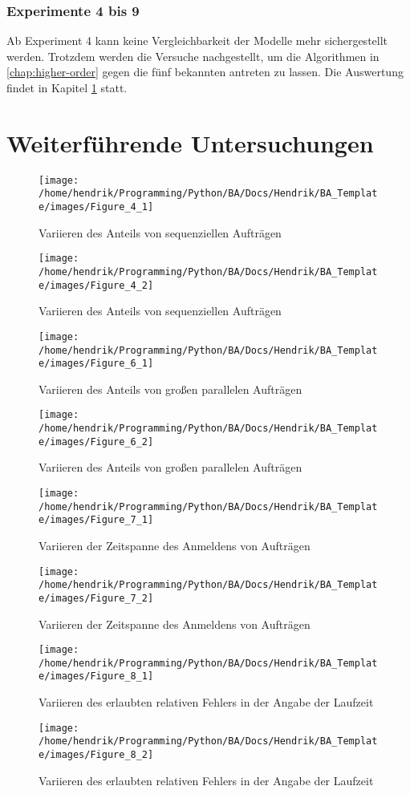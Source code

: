 \FloatBarrier

\subsubsection{Experimente 4 bis 9}
Ab Experiment 4 kann keine Vergleichbarkeit der Modelle mehr sichergestellt werden. Trotzdem werden die Versuche nachgestellt, um die Algorithmen in \ref{chap:higher-order} gegen die fünf bekannten antreten zu lassen. Die Auswertung findet in Kapitel \ref{weiter} statt.


\section{Weiterführende Untersuchungen}
\label{weiter}

\begin{figure}	
	\texttt{[image: /home/hendrik/Programming/Python/BA/Docs/Hendrik/BA\_Template/images/Figure\_4\_1]}
	\caption{Variieren des Anteils von sequenziellen Aufträgen}
	\label{figure_4_1}
\end{figure}
\begin{figure}	
	\texttt{[image: /home/hendrik/Programming/Python/BA/Docs/Hendrik/BA\_Template/images/Figure\_4\_2]}
	\caption{Variieren des Anteils von sequenziellen Aufträgen}
	\label{figure_4_2}
\end{figure}
\begin{figure}	
	\texttt{[image: /home/hendrik/Programming/Python/BA/Docs/Hendrik/BA\_Template/images/Figure\_6\_1]}
	\caption{Variieren des Anteils von großen parallelen Aufträgen}
	\label{figure_6_1}
\end{figure}
\begin{figure}	
	\texttt{[image: /home/hendrik/Programming/Python/BA/Docs/Hendrik/BA\_Template/images/Figure\_6\_2]}
	\caption{Variieren des Anteils von großen parallelen Aufträgen}
	\label{figure_6_2}
\end{figure}
\begin{figure}	
	\texttt{[image: /home/hendrik/Programming/Python/BA/Docs/Hendrik/BA\_Template/images/Figure\_7\_1]}
	\caption{Variieren der Zeitspanne des Anmeldens von Aufträgen}
	\label{figure_7_1}
\end{figure}
\begin{figure}	
	\texttt{[image: /home/hendrik/Programming/Python/BA/Docs/Hendrik/BA\_Template/images/Figure\_7\_2]}
	\caption{Variieren der Zeitspanne des Anmeldens von Aufträgen}
	\label{figure_7_2}
\end{figure}
\begin{figure}	
	\texttt{[image: /home/hendrik/Programming/Python/BA/Docs/Hendrik/BA\_Template/images/Figure\_8\_1]}
	\caption{Variieren des erlaubten relativen Fehlers in der Angabe der Laufzeit}
	\label{figure_8_1}
\end{figure}
\begin{figure}	
	\texttt{[image: /home/hendrik/Programming/Python/BA/Docs/Hendrik/BA\_Template/images/Figure\_8\_2]}
	\caption{Variieren des erlaubten relativen Fehlers in der Angabe der Laufzeit}
	\label{figure_8_2}
\end{figure}



